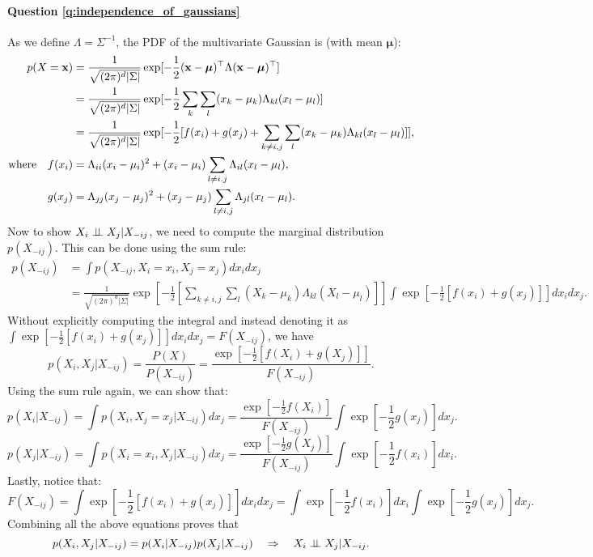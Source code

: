\paragraph{Question \ref{q:independence_of_gaussians}}
As we define $\Lambda = \Sigma^{-1}$, the PDF of the multivariate Gaussian is (with mean $\bm{\mu}$):
\begin{equation*}
\begin{aligned}
p(X = \mathbf{x}) &= \frac{1}{\sqrt{ (2 \pi)^d | \Sigma |}} \exp [ -\frac{1}{2} (\mathbf{x} - \bm{\mu})^\top \Lambda (\mathbf{x} - \bm{\mu})^\top ] \\
&= \frac{1}{\sqrt{ (2 \pi)^d | \Sigma |}} \exp [ -\frac{1}{2} \sum_k \sum_l (x_k - \mu_k) \Lambda_{kl} (x_l - \mu_l) ] \\
&= \frac{1}{\sqrt{ (2 \pi)^d | \Sigma |}} \exp [ -\frac{1}{2} [ f(x_i) + g(x_j) + \sum_{k \neq i, j} \sum_l (x_k - \mu_k) \Lambda_{kl} (x_l - \mu_l) ] ], \\
\text{where} \quad f(x_i) &= \Lambda_{ii} (x_i - \mu_i)^2 + (x_i - \mu_i) \sum_{l \neq i. j} \Lambda_{il} (x_l - \mu_l), \\
g(x_j) &= \Lambda_{jj} (x_j - \mu_j)^2 + (x_j - \mu_j) \sum_{l \neq i, j} \Lambda_{jl} (x_l - \mu_l).
\end{aligned}
\end{equation*}
%
Now to show $X_i \perp\!\!\!\perp X_j | X_{-ij}$, we need to compute the marginal distribution $p(X_{-ij})$. This can be done using the sum rule:
\begin{equation}
\begin{aligned}
p(X_{-ij}) &= \int p(X_{-ij}, X_i = x_i, X_j = x_j) d x_i d x_j \\
&= \frac{1}{\sqrt{ (2 \pi)^d | \Sigma |}} \exp [ -\frac{1}{2} [ \sum_{k \neq i, j} \sum_l (X_k - \mu_k) \Lambda_{kl} (X_l - \mu_l) ] ] \int \exp [ -\frac{1}{2} [ f(x_i) + g(x_j) ] ] d x_i d x_j.
\end{aligned}
\end{equation}
Without explicitly computing the integral and instead denoting it as $\int \exp [ -\frac{1}{2} [ f(x_i) + g(x_j) ] ] d x_i d x_j = F(X_{-ij})$, we have
$$p(X_i, X_j | X_{-ij}) = \frac{P(X)}{P(X_{-ij})} = \frac{ \exp [ -\frac{1}{2} [ f(X_i) + g(X_j) ] ] }{F(X_{-ij})}.$$
Using the sum rule again, we can show that:
$$p(X_i | X_{-ij}) = \int p(X_i, X_j = x_j | X_{-ij}) d x_j = \frac{ \exp [ -\frac{1}{2} f(X_i) ] }{F(X_{-ij})} \int \exp[-\frac{1}{2} g(x_j)] d x_j.$$
$$p(X_j | X_{-ij}) = \int p(X_i = x_i, X_j | X_{-ij}) d x_j = \frac{ \exp [ -\frac{1}{2} g(X_j) ] }{F(X_{-ij})} \int \exp[-\frac{1}{2} f(x_i)] d x_i.$$
Lastly, notice that:
$$F(X_{-ij}) = \int \exp [ -\frac{1}{2} [ f(x_i) + g(x_j) ] ] d x_i d x_j = \int \exp[-\frac{1}{2} f(x_i)] d x_i \int \exp[-\frac{1}{2} g(x_j)] d x_j.$$
Combining all the above equations proves that
$$p(X_i, X_j | X_{-ij}) = p(X_i | X_{-ij}) p(X_j | X_{-ij}) \quad \Rightarrow \quad X_i \perp\!\!\!\perp X_j | X_{-ij}.$$

